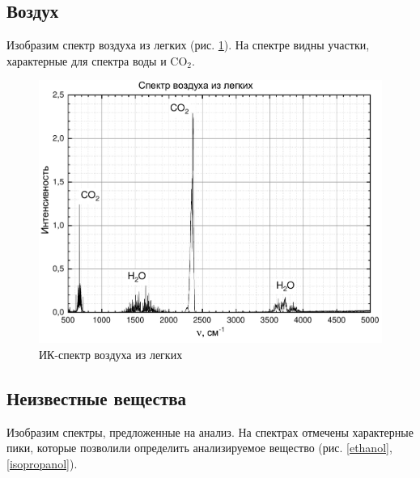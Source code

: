 \subsection{Воздух}
Изобразим спектр воздуха из легких (рис. \ref{air_co2}). На спектре видны участки, характерные для спектра воды и CO$_2$.
\begin{figure}[H]
	\centering
	\includegraphics[angle = 90, height=0.95\textheight]{data/dihaniye}
	\caption{ИК-спектр воздуха из легких}
	\label{air_co2}
\end{figure}
\subsection{Неизвестные вещества}
Изобразим спектры, предложенные на анализ. На спектрах отмечены характерные пики, которые позволили определить анализируемое вещество (рис. \ref{ethanol}, \ref{isopropanol}).

